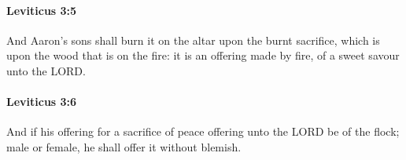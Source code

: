 		\paragraph{Leviticus 3:5} %
			\label{LEVITICUS-3-5}

			And Aaron’s sons shall burn it on the altar upon the burnt sacrifice, which is upon the wood that is on the fire: it is an offering made by fire, of a sweet savour unto the LORD.


		\paragraph{Leviticus 3:6} %
			\label{LEVITICUS-3-6}

			And if his offering for a sacrifice of peace offering unto the LORD be of the flock; male or female, he shall offer it without blemish.


